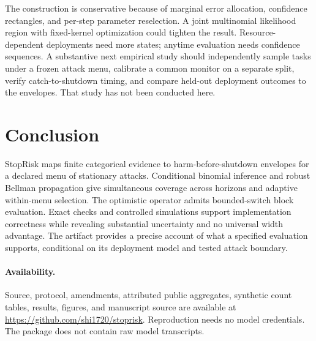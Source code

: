 \documentclass[10pt]{article}
\begin{document}
The construction is conservative because of marginal error allocation, confidence rectangles, and per-step parameter reselection. A joint multinomial likelihood region with fixed-kernel optimization could tighten the result. Resource-dependent deployments need more states; anytime evaluation needs confidence sequences. A substantive next empirical study should independently sample tasks under a frozen attack menu, calibrate a common monitor on a separate split, verify catch-to-shutdown timing, and compare held-out deployment outcomes to the envelopes. That study has not been conducted here.

\section{Conclusion}
StopRisk maps finite categorical evidence to harm-before-shutdown envelopes for a declared menu of stationary attacks. Conditional binomial inference and robust Bellman propagation give simultaneous coverage across horizons and adaptive within-menu selection. The optimistic operator admits bounded-switch block evaluation. Exact checks and controlled simulations support implementation correctness while revealing substantial uncertainty and no universal width advantage. The artifact provides a precise account of what a specified evaluation supports, conditional on its deployment model and tested attack boundary.

\paragraph{Availability.}
Source, protocol, amendments, attributed public aggregates, synthetic count tables, results, figures, and manuscript source are available at \url{https://github.com/shi1720/stoprisk}. Reproduction needs no model credentials. The package does not contain raw model transcripts.
\end{document}
